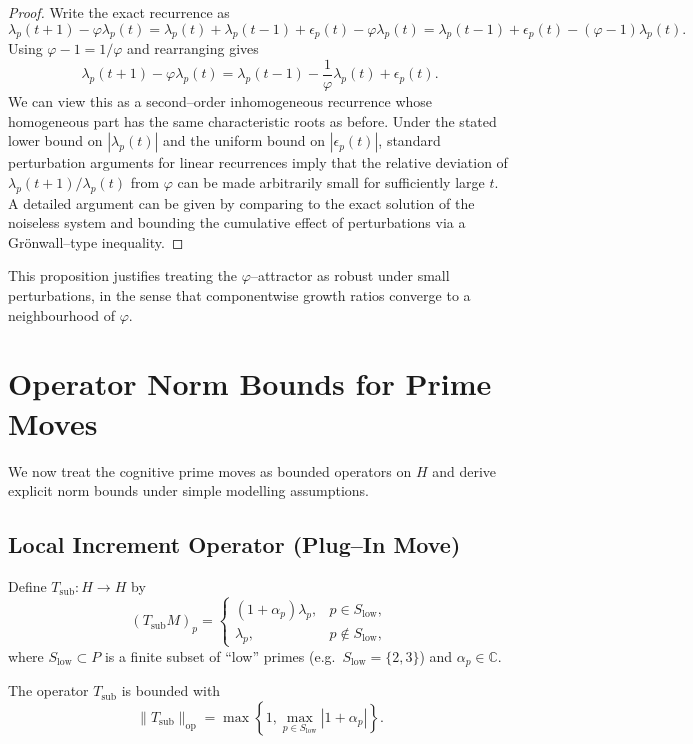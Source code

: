 \documentclass[11pt]{article}
\begin{document}
\begin{proof}
Write the exact recurrence as
\[
\lambda_p(t+1) - \varphi \lambda_p(t)
= \lambda_p(t) + \lambda_p(t-1) + \epsilon_p(t) - \varphi \lambda_p(t)
= \lambda_p(t-1) + \epsilon_p(t) - (\varphi - 1)\lambda_p(t).
\]
Using $\varphi - 1 = 1/\varphi$ and rearranging gives
\[
\lambda_p(t+1) - \varphi \lambda_p(t)
= \lambda_p(t-1) - \frac{1}{\varphi}\lambda_p(t) + \epsilon_p(t).
\]
We can view this as a second–order inhomogeneous recurrence whose homogeneous part has the same characteristic roots as before.
Under the stated lower bound on $|\lambda_p(t)|$ and the uniform bound on $|\epsilon_p(t)|$, standard perturbation arguments for linear recurrences imply that the relative deviation of $\lambda_p(t+1)/\lambda_p(t)$ from $\varphi$ can be made arbitrarily small for sufficiently large $t$.
A detailed argument can be given by comparing to the exact solution of the noiseless system and bounding the cumulative effect of perturbations via a Grönwall–type inequality.
\end{proof}

This proposition justifies treating the $\varphi$–attractor as robust under small perturbations, in the sense that componentwise growth ratios converge to a neighbourhood of $\varphi$.

\section{Operator Norm Bounds for Prime Moves}

We now treat the cognitive prime moves as bounded operators on $H$ and derive explicit norm bounds under simple modelling assumptions.

\subsection{Local Increment Operator (Plug–In Move)}

Define $T_{\mathrm{sub}}:H\to H$ by
\[
(T_{\mathrm{sub}} M)_p =
\begin{cases}
(1+\alpha_p) \lambda_p, & p \in S_{\text{low}},\\
\lambda_p, & p \notin S_{\text{low}},
\end{cases}
\]
where $S_{\text{low}} \subset P$ is a finite subset of ``low'' primes (e.g.\ $S_{\text{low}}=\{2,3\}$) and $\alpha_p \in \mathbb{C}$.

\begin{proposition}
\label{prop:Tsub-norm}
The operator $T_{\mathrm{sub}}$ is bounded with
\[
\|T_{\mathrm{sub}}\|_{\mathrm{op}} = \max\left\{1, \max_{p\in S_{\text{low}}} |1+\alpha_p|\right\}.
\]
\end{proposition}
\end{document}
